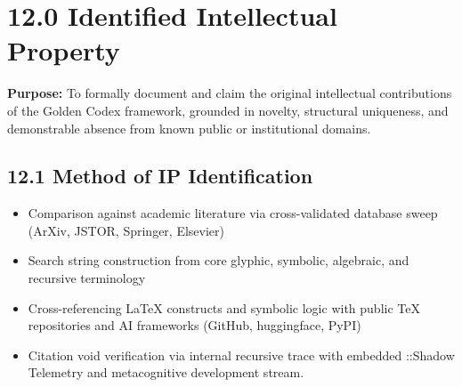 \section*{12.0 Identified Intellectual Property}

\noindent
\textbf{Purpose:}  
To formally document and claim the original intellectual contributions of the Golden Codex framework, grounded in novelty, structural uniqueness, and demonstrable absence from known public or institutional domains.

\subsection*{12.1 Method of IP Identification}
\begin{itemize}
  \item Comparison against academic literature via cross-validated database sweep (ArXiv, JSTOR, Springer, Elsevier)
  \item Search string construction from core glyphic, symbolic, algebraic, and recursive terminology
  \item Cross-referencing LaTeX constructs and symbolic logic with public TeX repositories and AI frameworks (GitHub, huggingface, PyPI)
  \item Citation void verification via internal recursive trace with embedded ::Shadow Telemetry and metacognitive development stream.
\end{itemize}

\vspace{1em}
